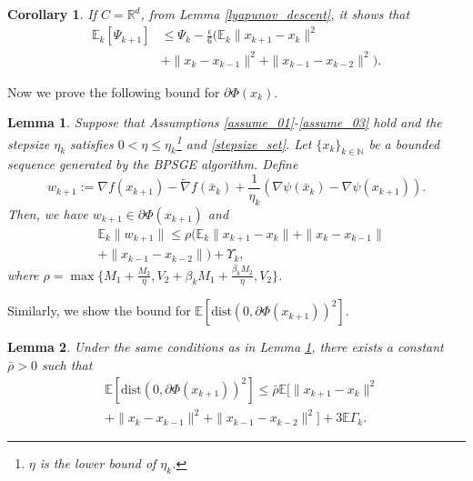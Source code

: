 \documentclass[letterpaper]{article} %
\newtheorem{lemma}{Lemma}
\newtheorem{corollary}{Corollary}
\begin{document}
	\begin{corollary}\label{lemma_Phi_kk1_Rd}
		If $C=\mathbb{R}^{d}$,  from Lemma \ref{lyapunov_descent}, it shows that
		\begin{align*}
			\mathbb{E}_{k}[\Psi_{k+1}]&\le \Psi_{k}-\frac{\epsilon}{6}(\mathbb{E}_{k}\|x_{k+1}-x_{k}\|^{2}\\
			&+\|x_{k}-x_{k-1}\|^{2}+\|x_{k-1}-x_{k-2}\|^{2}).
		\end{align*}
	\end{corollary}
	Now we prove the following bound for   $\partial\Phi(x_{k})$.
	\begin{lemma} \label{subgradient_bound}
		Suppose that Assumptions \ref{assume_01}-\ref{assume_03} hold and the stepsize $\eta_{k}$ satisfies $0<\eta\le \eta_{k}$\footnote{$\eta$ is the lower bound of $\eta_{k}$.} and \eqref{stepsize_set}. Let $\{x_{k}\}_{k\in\mathbb{N}}$ be a bounded sequence generated by the BPSGE algorithm. Define
		\[
		w_{k+1}:=\nabla f(x_{k+1})-\tilde{\nabla}f(\bar{x}_{k})+\frac{1}{\eta_{k}}(\nabla \psi(\bar{x}_{k})-\nabla \psi(x_{k+1})).
		\]
		Then, we have $w_{k+1}\in\partial \Phi(x_{k+1})$ and
		\begin{align*}
			&\mathbb{E}_{k}\|w_{k+1}\|
			\le\rho(\mathbb{E}_{k}\|x_{k+1}-x_{k}\|+\|x_{k}-x_{k-1}\|\\
			&+\|x_{k-1}-x_{k-2}\|) +\Upsilon_{k},
		\end{align*}
		where $\rho=\max\{M_{1}+\frac{M_{2}}{\eta}, V_{2}+\beta_{k}M_{1}+\frac{\beta_{k}M_{2}}{\eta}, V_{2}\}$.
	\end{lemma}

	Similarly,  we show the   bound for   $\mathbb{E}[\mathrm{dist}(0,\partial\Phi(x_{k+1}))^{2}]$.
	\begin{lemma}\label{lemma_dist2}
		Under the same conditions as in Lemma \ref{subgradient_bound}, there exists a constant $\bar{\rho}>0$ such that
		\begin{align*}
			&\mathbb{E}[\mathrm{dist}(0,\partial\Phi(x_{k+1}))^{2}]
			\le\bar{\rho}\mathbb{E}[\|x_{k+1}-x_{k}\|^{2}\\
			&+\|x_{k}-x_{k-1}\|^{2}+\|x_{k-1}-x_{k-2}\|^{2}] +3\mathbb{E}\Gamma_{k}.
		\end{align*}
	\end{lemma}
\end{document}
